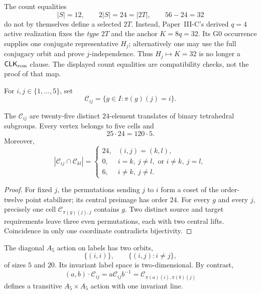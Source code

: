 \documentclass[12pt,a4paper]{article}
\newcommand{\CLKrem}{\mathsf{CLK}_{\rm rem}}
\begin{document}
\begin{corollary}
\label{p6:cor:correct-onset-boundary}
The count equalities
\[
|S|=12,\qquad 2|S|=24=|2T|,\qquad56-24=32
\]
do not by themselves define a selected \(2T\).  Instead, Paper~III-C's
derived \(q=4\) active realization fixes the \emph{type} \(2T\) and the
anchor \(K=8q=32\).  Its G0 occurrence supplies one conjugate representative
\(H_j\); alternatively one may use the full conjugacy orbit and prove
\(j\)-independence.  Thus \(H_j\mapsto K=32\) is no longer a
\(\CLKrem\) clause.  The displayed count equalities are compatibility checks,
not the proof of that map.
\end{corollary}

For \(i,j\in\{1,\ldots,5\}\), set
\[
\mathcal C_{ij}=\{g\in I:\pi(g)(j)=i\}.
\]

\begin{theorem}
\label{p6:thm:cell-incidence}
The \(\mathcal C_{ij}\) are twenty-five distinct \(24\)-element translates
of binary tetrahedral subgroups.  Every vertex belongs to five cells and
\[
25\cdot24=120\cdot5.
\]
Moreover,
\[
|\mathcal C_{ij}\cap\mathcal C_{kl}|
=
\begin{cases}
24,&(i,j)=(k,l),\\
0,&i=k,\ j\ne l,\text{ or }i\ne k,\ j=l,\\
6,&i\ne k,\ j\ne l.
\end{cases}
\]
\end{theorem}

\begin{proof}
For fixed \(j\), the permutations sending \(j\) to \(i\) form a coset of
the order-twelve point stabilizer; its central preimage has order \(24\).
For every \(g\) and every \(j\), precisely one cell
\(\mathcal C_{\pi(g)(j),j}\) contains \(g\).  Two distinct source and target
requirements leave three even permutations, each with two central lifts.
Coincidence in only one coordinate contradicts bijectivity.
\end{proof}

\begin{theorem}
\label{p6:thm:cell-actions}
The diagonal \(A_5\) action on labels has two orbits,
\[
\{(i,i)\},\qquad\{(i,j):i\ne j\},
\]
of sizes \(5\) and \(20\).  Its invariant label space is two-dimensional.
By contrast,
\[
(a,b)\cdot\mathcal C_{ij}
=a\mathcal C_{ij}b^{-1}
=\mathcal C_{\pi(a)(i),\pi(b)(j)}
\]
defines a transitive \(A_5\times A_5\) action with one invariant line.
\end{theorem}
\end{document}
